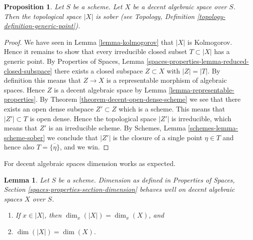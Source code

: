 \documentclass{stacks-project}
\theoremstyle{plain}
\newtheorem{proposition}[subsection]{Proposition}
\newtheorem{lemma}[subsection]{Lemma}
\theoremstyle{definition}
\theoremstyle{remark}
\numberwithin{equation}{subsection}
\begin{document}
\begin{proposition}
\label{proposition-reasonable-sober}
Let $S$ be a scheme. Let $X$ be a decent algebraic space over $S$.
Then the topological space $|X|$ is sober (see
Topology, Definition \ref{topology-definition-generic-point}).
\end{proposition}

\begin{proof}
We have seen in Lemma \ref{lemma-kolmogorov} that $|X|$ is Kolmogorov.
Hence it remains to show that every irreducible closed subset
$T \subset |X|$ has a generic point. By
Properties of Spaces,
Lemma \ref{spaces-properties-lemma-reduced-closed-subspace}
there exists a closed subspace $Z \subset X$ with $|Z| = |T|$.
By definition this means that $Z \to X$ is a representable morphism
of algebraic spaces. Hence $Z$ is a decent algebraic space
by Lemma \ref{lemma-representable-properties}. By
Theorem \ref{theorem-decent-open-dense-scheme}
we see that there exists an open dense subspace $Z' \subset Z$
which is a scheme. This means that $|Z'| \subset T$ is open dense.
Hence the topological space $|Z'|$ is irreducible, which means that
$Z'$ is an irreducible scheme. By
Schemes, Lemma \ref{schemes-lemma-scheme-sober}
we conclude that $|Z'|$ is the closure of a single point $\eta \in T$
and hence also $T = \overline{\{\eta\}}$, and we win.
\end{proof}

\noindent
For decent algebraic spaces dimension works as expected.

\begin{lemma}
\label{lemma-dimension-decent-space}
Let $S$ be a scheme. Dimension as defined in
Properties of Spaces, Section \ref{spaces-properties-section-dimension}
behaves well on decent algebraic spaces $X$ over $S$.
\begin{enumerate}
\item If $x \in |X|$, then $\dim_x(|X|) = \dim_x(X)$, and
\item $\dim(|X|) = \dim(X)$.
\end{enumerate}
\end{lemma}
\end{document}
